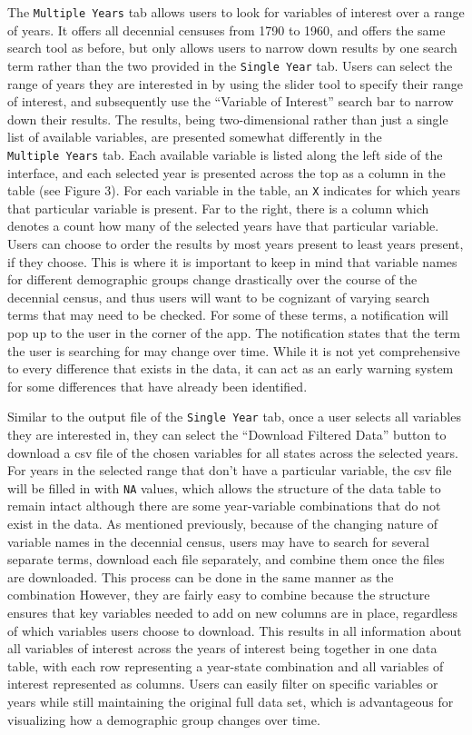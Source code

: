 \documentclass[11pt,]{article}
\begin{document}
The \texttt{Multiple\ Years} tab allows users to look for variables of
interest over a range of years. It offers all decennial censuses from
1790 to 1960, and offers the same search tool as before, but only allows
users to narrow down results by one search term rather than the two
provided in the \texttt{Single\ Year} tab. Users can select the range of
years they are interested in by using the slider tool to specify their
range of interest, and subsequently use the ``Variable of Interest''
search bar to narrow down their results. The results, being
two-dimensional rather than just a single list of available variables,
are presented somewhat differently in the \texttt{Multiple\ Years} tab.
Each available variable is listed along the left side of the interface,
and each selected year is presented across the top as a column in the
table (see Figure 3). For each variable in the table, an \texttt{X}
indicates for which years that particular variable is present. Far to
the right, there is a column which denotes a count how many of the
selected years have that particular variable. Users can choose to order
the results by most years present to least years present, if they
choose. This is where it is important to keep in mind that variable
names for different demographic groups change drastically over the
course of the decennial census, and thus users will want to be cognizant
of varying search terms that may need to be checked. For some of these
terms, a notification will pop up to the user in the corner of the app.
The notification states that the term the user is searching for may
change over time. While it is not yet comprehensive to every difference
that exists in the data, it can act as an early warning system for some
differences that have already been identified.

Similar to the output file of the \texttt{Single\ Year} tab, once a user
selects all variables they are interested in, they can select the
``Download Filtered Data'' button to download a csv file of the chosen
variables for all states across the selected years. For years in the
selected range that don't have a particular variable, the csv file will
be filled in with \texttt{NA} values, which allows the structure of the
data table to remain intact although there are some year-variable
combinations that do not exist in the data. As mentioned previously,
because of the changing nature of variable names in the decennial
census, users may have to search for several separate terms, download
each file separately, and combine them once the files are downloaded.
This process can be done in the same manner as the combination However,
they are fairly easy to combine because the structure ensures that key
variables needed to add on new columns are in place, regardless of which
variables users choose to download. This results in all information
about all variables of interest across the years of interest being
together in one data table, with each row representing a year-state
combination and all variables of interest represented as columns. Users
can easily filter on specific variables or years while still maintaining
the original full data set, which is advantageous for visualizing how a
demographic group changes over time.
\end{document}
